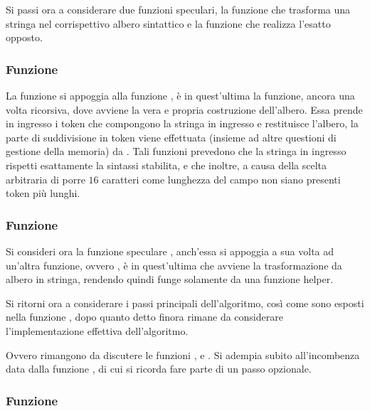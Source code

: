 \documentclass[11pt,letterpaper,twoside]{article}
\begin{document}
Si passi ora a considerare due funzioni speculari, la funzione
 che trasforma una stringa nel
corrispettivo albero sintattico e la funzione  che realizza l'esatto opposto.

\subsubsection{Funzione }

La funzione  si appoggia alla funzione , è in
quest'ultima la funzione, ancora una volta ricorsiva, dove avviene la vera e
propria costruzione dell'albero. Essa prende in ingresso i token che compongono
la stringa in ingresso e restituisce l'albero, la parte di suddivisione in token
viene effettuata (insieme ad altre questioni di gestione della memoria) da
. Tali funzioni prevedono che la stringa in ingresso rispetti
esattamente la sintassi stabilita, e che inoltre, a causa della scelta arbitraria
di porre $16$ caratteri come lunghezza del campo  non siano
presenti token più lunghi.

\subsubsection{Funzione }

Si consideri ora la funzione speculare , anch'essa si
appoggia a sua volta ad un'altra funzione, ovvero , è in
quest'ultima che avviene la trasformazione da albero in stringa, rendendo quindi
 funge solamente da una funzione helper.


Si ritorni ora a considerare i passi principali dell'algoritmo, così come sono
esposti nella funzione , dopo quanto detto finora rimane da
considerare l'implementazione effettiva dell'algoritmo.


Ovvero rimangono da discutere le funzioni ,  e
. Si adempia subito all'incombenza data dalla funzione
, di cui si ricorda fare parte di un passo opzionale.

\subsubsection{Funzione }
\end{document}
